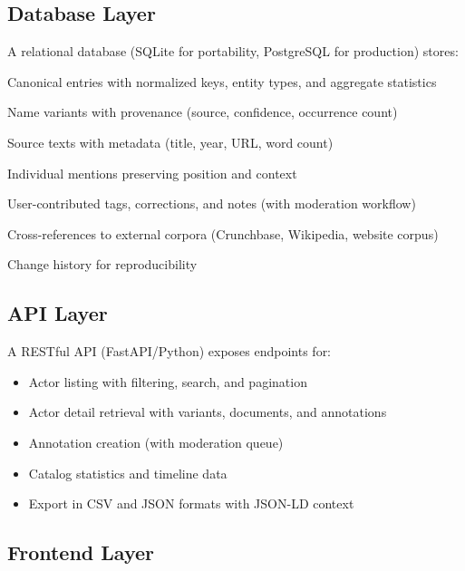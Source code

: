 \documentclass[../main.tex]{subfiles}
\begin{document}
\subsection{Database Layer}

A relational database (SQLite for portability, PostgreSQL for production) stores:

\begin{description}[leftmargin=0.5cm, itemsep=0.2em]
\item[Actors] Canonical entries with normalized keys, entity types, and aggregate statistics
\item[ActorVariants] Name variants with provenance (source, confidence, occurrence count)
\item[Documents] Source texts with metadata (title, year, URL, word count)
\item[ActorMentions] Individual mentions preserving position and context
\item[Annotations] User-contributed tags, corrections, and notes (with moderation workflow)
\item[CorpusLinks] Cross-references to external corpora (Crunchbase, Wikipedia, website corpus)
\item[AuditLog] Change history for reproducibility
\end{description}

\subsection{API Layer}

A RESTful API (FastAPI/Python) exposes endpoints for:

\begin{itemize}[leftmargin=*, itemsep=0.1em]
\item Actor listing with filtering, search, and pagination
\item Actor detail retrieval with variants, documents, and annotations
\item Annotation creation (with moderation queue)
\item Catalog statistics and timeline data
\item Export in CSV and JSON formats with JSON-LD context
\end{itemize}

\subsection{Frontend Layer}
\end{document}
